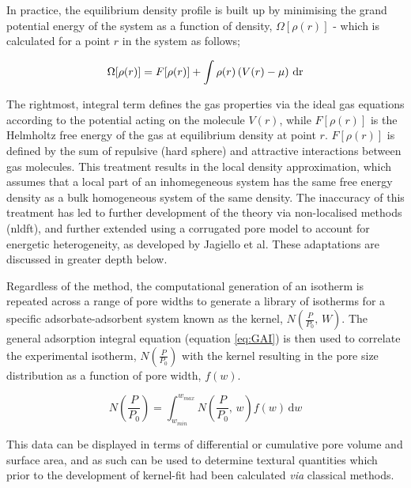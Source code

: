 In practice, the equilibrium density profile is built up by minimising the grand potential energy of the system as a function of density, $\Omega[\rho(r)]$ - which is calculated for a point $r$ in the system as follows;

\begin{equation}
\Omega[\rho(r)] = F[\rho(r)] + \int \rho(r)\left(V(r) - \mu\right) \,\rm{d}r
\end{equation}

The rightmost, integral term defines the gas properties via the ideal gas equations according to the potential acting on the molecule $V(r)$, while $F[\rho(r)]$ is the Helmholtz free energy of the gas at equilibrium density at point $r$. $F[\rho(r)]$ is defined by the sum of repulsive (hard sphere) and attractive interactions between gas molecules. This treatment results in the local density approximation, which assumes that a local part of an inhomegeneous system has the same free energy density as a bulk homogeneous system of the same density. The inaccuracy of this treatment has led to further development of the theory via non-localised methods (\acrfull{nldft}), \citep{tarazona1987phase, lastoskie1993pore, landers2013density} and further extended using a corrugated pore model to account for energetic heterogeneity, as developed by Jagiello et al.\citep{Jagiello20132D} These adaptations are discussed in greater depth below.

Regardless of the method, the computational generation of an isotherm is repeated across a range of pore widths to generate a library of isotherms for a specific \gls{adsorbate}-\gls{adsorbent} system known as the kernel, $N\left(\frac{P}{P_0}, \, W\right)$. The general \gls{adsorption} integral equation (equation \ref{eq:GAI}) is then used to correlate the experimental isotherm, $N\left(\frac{P}{P_0}\right)$  with the kernel resulting in the pore size distribution as a function of pore width, $f(w)$.\citep{Thommes2015Physisorption}

\begin{equation} \label{eq:GAI}
    N\left(\frac{P}{P_0}\right) = \int_{w_{min}}^{w_{max}} N\left(\frac{P}{P_0}, \, w \right) f(w) \, \mathrm{d}w
\end{equation}

This data can be displayed in terms of differential or cumulative pore volume and surface area, and as such can be used to determine textural quantities which prior to the development of kernel-fit  had been calculated \textit{via} classical methods.

